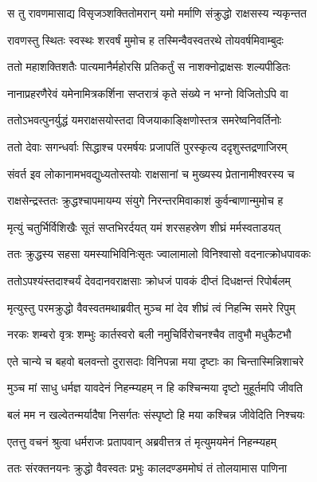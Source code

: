 \twolineshloka
{स तु रावणमासाद्य विसृजञ्शक्तितोमरान्}
{यमो मर्माणि संक्रुद्धो राक्षसस्य न्यकृन्तत} %

\twolineshloka
{रावणस्तु स्थितः स्वस्थः शरवर्षं मुमोच ह}
{तस्मिन्वैवस्वतरथे तोयवर्षमिवाम्बुदः} %

\twolineshloka
{ततो महाशक्तिशतैः पात्यमानैर्महोरसि}
{प्रतिकर्तुं स नाशक्नोद्राक्षसः शल्यपीडितः} %

\twolineshloka
{नानाप्रहरणैरेवं यमेनामित्रकर्शिना}
{सप्तरात्रं कृते संख्ये न भग्नो विजितोऽपि वा} %

\twolineshloka
{ततोऽभवत्पुनर्युद्धं यमराक्षसयोस्तदा}
{विजयाकाङ्क्षिणोस्तत्र समरेष्वनिवर्तिनोः} %

\twolineshloka
{ततो देवाः सगन्धर्वाः सिद्धाश्च परमर्षयः}
{प्रजापतिं पुरस्कृत्य ददृशुस्तद्रणाजिरम्} %

\twolineshloka
{संवर्त इव लोकानामभवद्युध्यतोस्तयोः}
{राक्षसानां च मुख्यस्य प्रेतानामीश्वरस्य च} %

\twolineshloka
{राक्षसेन्द्रस्ततः क्रुद्धश्चापमायम्य संयुगे}
{निरन्तरमिवाकाशं कुर्वन्बाणान्मुमोच ह} %

\twolineshloka
{मृत्युं चतुर्भिर्विशिखैः सूतं सप्तभिरर्दयत्}
{यमं शरसहस्रेण शीघ्रं मर्मस्वताडयत्} %

\twolineshloka
{ततः क्रुद्धस्य सहसा यमस्याभिविनिःसृतः}
{ज्वालामालो विनिश्वासो वदनात्क्रोधपावकः} %

\twolineshloka
{ततोऽपश्यंस्तदाश्चर्यं देवदानवराक्षसाः}
{क्रोधजं पावकं दीप्तं दिधक्षन्तं रिपोर्बलम्} %

\twolineshloka
{मृत्युस्तु परमक्रुद्धो वैवस्वतमथाब्रवीत्}
{मुञ्च मां देव शीघ्रं त्वं निहन्मि समरे रिपुम्} %

\twolineshloka
{नरकः शम्बरो वृत्रः शम्भुः कार्तस्वरो बली}
{नमुचिर्विरोचनश्चैव तावुभौ मधुकैटभौ} %

\twolineshloka
{एते चान्ये च बहवो बलवन्तो दुरासदाः}
{विनिपन्ना मया दृष्टाः का चिन्तास्मिन्निशाचरे} %

\twolineshloka
{मुञ्च मां साधु धर्मज्ञ यावदेनं निहन्म्यहम्}
{न हि कश्चिन्मया दृष्टो मुहूर्तमपि जीवति} %

\twolineshloka
{बलं मम न खल्वेतन्मर्यादैषा निसर्गतः}
{संस्पृष्टो हि मया कश्चिन्न जीवेदिति निश्चयः} %

\twolineshloka
{एतत्तु वचनं श्रुत्वा धर्मराजः प्रतापवान्}
{अब्रवीत्तत्र तं मृत्युमयमेनं निहन्म्यहम्} %

\twolineshloka
{ततः संरक्तनयनः क्रुद्धो वैवस्वतः प्रभुः}
{कालदण्डममोघं तं तोलयामास पाणिना} %

